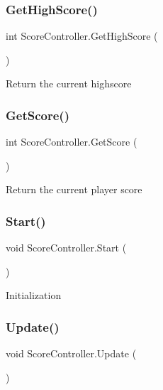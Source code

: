 \subsubsection{\texorpdfstring{Get\+High\+Score()}{GetHighScore()}}
{\footnotesize\ttfamily int Score\+Controller.\+Get\+High\+Score (\begin{DoxyParamCaption}{ }\end{DoxyParamCaption})}

Return the current highscore \mbox{\label{class_score_controller_a0cf2ee76b1f2f6c07b2b76d036bfa8c6}} 
\subsubsection{\texorpdfstring{Get\+Score()}{GetScore()}}
{\footnotesize\ttfamily int Score\+Controller.\+Get\+Score (\begin{DoxyParamCaption}{ }\end{DoxyParamCaption})}

Return the current player score \mbox{\label{class_score_controller_a24c8b4f29b0e90a9bf721023cd1c581d}} 
\subsubsection{\texorpdfstring{Start()}{Start()}}
{\footnotesize\ttfamily void Score\+Controller.\+Start (\begin{DoxyParamCaption}{ }\end{DoxyParamCaption})\hspace{0.3cm}{\ttfamily [private]}}

Initialization \mbox{\label{class_score_controller_a30682b0eb78ea3820856810083221ee6}} 
\subsubsection{\texorpdfstring{Update()}{Update()}}
{\footnotesize\ttfamily void Score\+Controller.\+Update (\begin{DoxyParamCaption}{ }\end{DoxyParamCaption})\hspace{0.3cm}{\ttfamily [private]}}


